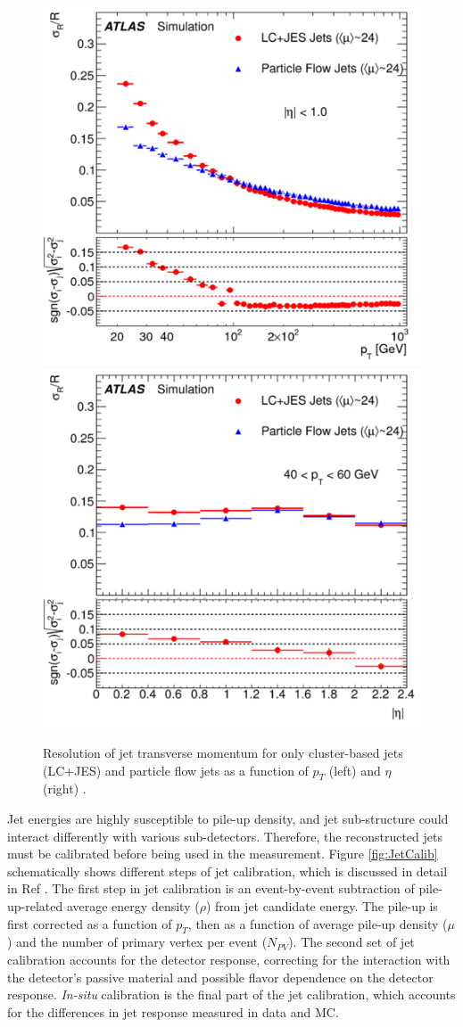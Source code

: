 \begin{figure}[!htbp]
    \centering
    \includegraphics[width=.48\linewidth]{figures/LHC/Pflow_vs_Calo_pt.pdf}
    \includegraphics[width=.48\linewidth]{figures/LHC/Pflow_vs_Calo_eta.pdf}
    \caption{ Resolution of jet transverse momentum for only cluster-based jets (LC+JES) and particle flow jets as a function of $p_{T}$ (left) and $\eta$ (right) \cite{ParticleFlow}.\label{fig:PflowvsCalo}}
\end{figure}

Jet energies are highly susceptible to pile-up density, and jet sub-structure could interact differently with various sub-detectors. Therefore, the reconstructed jets must be calibrated before being used in the measurement. Figure \ref{fig:JetCalib} schematically shows different steps of jet calibration, which is discussed in detail in Ref \cite{JetCalib}. The first step in jet calibration is an event-by-event subtraction of pile-up-related average energy density ($\rho$) from jet candidate energy. The pile-up is first corrected as a function of $p_{T}$, then as a function of average pile-up density ($\mu$) and the number of primary vertex per event ($N_{PV}$). The second set of jet calibration accounts for the detector response, correcting for the interaction with the detector's passive material and possible flavor dependence on the detector response. \textit{In-situ} calibration is the final part of the jet calibration, which accounts for the differences in jet response measured in data and MC. 

